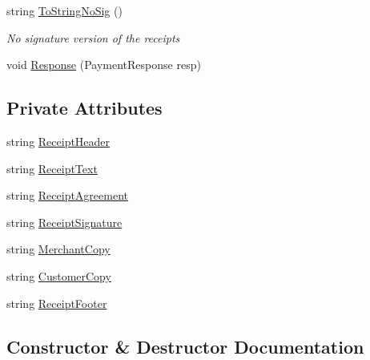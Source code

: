 \begin{DoxyCompactItemize}
string \mbox{\hyperlink{class_cert_complete_1_1_receipt_printer_a37048f7fb5c13d6238e6377651421191}{To\+String\+No\+Sig}} ()
\begin{DoxyCompactList}\small\item\em No signature version of the receipts \end{DoxyCompactList}\item 
void \mbox{\hyperlink{class_cert_complete_1_1_receipt_printer_a528e5c04e9215d15b4ec49d63c3e1ebb}{Response}} (Payment\+Response resp)
\end{DoxyCompactItemize}
\subsection*{Private Attributes}
\begin{DoxyCompactItemize}
\item 
string \mbox{\hyperlink{class_cert_complete_1_1_receipt_printer_adab8ac5c3f5125a8230bd502ab126ab8}{Receipt\+Header}}
\item 
string \mbox{\hyperlink{class_cert_complete_1_1_receipt_printer_a36c59964a9dba0f7ffadbe7823ba6245}{Receipt\+Text}}
\item 
string \mbox{\hyperlink{class_cert_complete_1_1_receipt_printer_a85b838450824fb1bf6dbbc2b20fae68b}{Receipt\+Agreement}}
\item 
string \mbox{\hyperlink{class_cert_complete_1_1_receipt_printer_a13619f772b44c80ffb151d44babb1b05}{Receipt\+Signature}}
\item 
string \mbox{\hyperlink{class_cert_complete_1_1_receipt_printer_a2661eef00300f1e6df07ef732bdd960f}{Merchant\+Copy}}
\item 
string \mbox{\hyperlink{class_cert_complete_1_1_receipt_printer_a33bfa50396db109992fa910208bd0583}{Customer\+Copy}}
\item 
string \mbox{\hyperlink{class_cert_complete_1_1_receipt_printer_ab8205ae0948513a29915e9df0583d68c}{Receipt\+Footer}}
\end{DoxyCompactItemize}


\subsection{Constructor \& Destructor Documentation}
\mbox{\label{class_cert_complete_1_1_receipt_printer_a70fb4378ea2d0f6857fa4e44036ba513}} 
